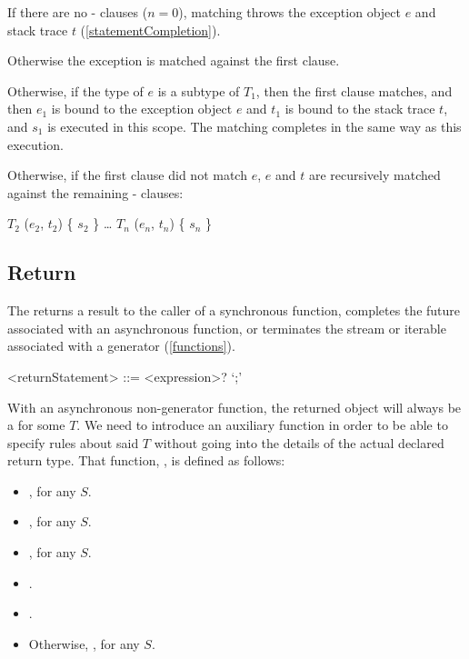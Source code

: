 \documentclass[makeidx]{article}
\begin{document}
{\LMHash{}%
If there are no \ON{}-\CATCH{} clauses ($n = 0$), matching throws
the exception object $e$ and stack trace $t$
(\ref{statementCompletion}).

\LMHash{}%
Otherwise the exception is matched against the first clause.

\LMHash{}%
Otherwise, if the type of $e$ is a subtype of $T_1$,
then the first clause matches,
and then $e_1$ is bound to the exception object $e$
and $t_1$ is bound to the stack trace $t$,
and $s_1$ is executed in this scope.
The matching completes in the same way as this execution.

\LMHash{}%
Otherwise, if the first clause did not match $e$,
$e$ and $t$ are recursively matched against
the remaining \ON{}-\CATCH{} clauses:

\begin{normativeDartCode}
\ON{} $T_2$ \CATCH{} ($e_2$, $t_2$) \{ $s_2$ \}
\ldots
\ON{} $T_n$ \CATCH{} ($e_n$, $t_n$) \{ $s_n$ \}
\end{normativeDartCode}


\subsection{Return}

\LMHash{}%
The 
returns a result to the caller of a synchronous function,
completes the future associated with an asynchronous function,
or terminates the stream or iterable associated with a generator
(\ref{functions}).

\begin{grammar}
<returnStatement> ::= \RETURN{} <expression>? `;'
\end{grammar}

\LMHash{}%
With an asynchronous non-generator function,
the returned object will always be a  for some $T$.
We need to introduce an auxiliary function
in order to be able to specify rules about said $T$
without going into the details of the actual declared return type.
That function, \FutureValueTypeOfName, is defined as follows:

\begin{itemize}
\item {},
  for any $S$.
\item {}, for any $S$.
\item {}, for any $S$.
\item \DefEquals{\FutureValueTypeOf{\VOID}}{\VOID}.
\item \DefEquals{\FutureValueTypeOf{\DYNAMIC}}{\DYNAMIC}.
\item Otherwise, ,
  for any $S$.
\end{itemize}

}
\end{document}
